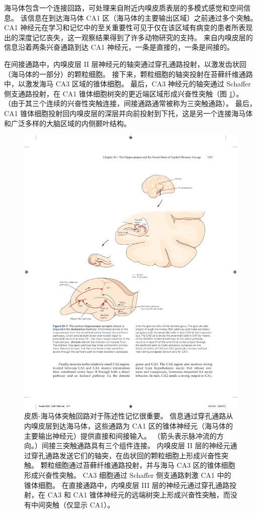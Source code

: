 海马体包含一个连接回路，可处理来自附近内嗅皮质表层的多模式感觉和空间信息。 该信息在到达海马体 CA1 区（海马体的主要输出区域）之前通过多个突触。 CA1 神经元在学习和记忆中的至关重要性可见于仅在该区域有病变的患者所表现出的深度记忆丧失，这一观察结果得到了许多动物研究的支持。 来自内嗅皮层的信息沿着两条兴奋通路到达 CA1 神经元，一条是直接的，一条是间接的。

在间接通路中，内嗅皮层 II 层神经元的轴突通过穿孔通路投射，以激发齿状回（海马体的一部分）的颗粒细胞。 接下来，颗粒细胞的轴突投射在苔藓纤维通路中，以激发海马 CA3 区域的锥体细胞。 最后，CA3 神经元的轴突通过 Schaffer 侧支通路投射，在 CA1 锥体细胞树突的更近端区域形成兴奋性突触（图 \ref{fig:54_1}）。 （由于其三个连续的兴奋性突触连接，间接通路通常被称为三突触通路）。 最后，CA1 锥体细胞投射回内嗅皮层的深层并向前投射到下托，这是另一个连接海马体和广泛多样的大脑区域的内侧颞叶结构。

\begin{figure}[htbp]
	\centering
	\includegraphics[width=0.9\linewidth]{chap54/fig_54_1}
	\caption{皮质-海马体突触回路对于陈述性记忆很重要。 信息通过穿孔通路从内嗅皮层到达海马体，这些通路为 CA1 区的锥体神经元（海马体的主要输出神经元）提供直接和间接输入。 （箭头表示脉冲流的方向。）间接三突触通路具有三个组件连接。 内嗅皮层 II 层的神经元通过穿孔通路发送它们的轴突，在齿状回的颗粒细胞上形成兴奋性突触。 颗粒细胞通过苔藓纤维通路投射，并与海马 CA3 区的锥体细胞形成兴奋性突触。 CA3 细胞通过 Schaffer 侧支通路刺激 CA1 中的锥体细胞。 在直接通路中，内嗅皮层 III 层的神经元通过穿孔通路投射，在 CA3 和 CA1 锥体神经元的远端树突上形成兴奋性突触，而没有中间突触（仅显示 CA1）。}
	\label{fig:54_1}
\end{figure}

